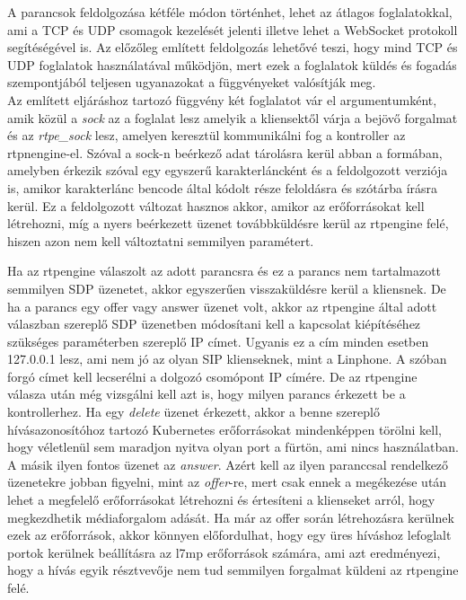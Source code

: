 A parancsok feldolgozása kétféle módon történhet, lehet az átlagos foglalatokkal, ami 
a TCP és UDP csomagok kezelését jelenti illetve lehet a WebSocket protokoll segítéségével 
is. Az előzőleg említett feldolgozás lehetővé teszi, hogy mind TCP és UDP
foglalatok használatával működjön, mert ezek a foglalatok küldés és fogadás szempontjából
teljesen ugyanazokat a függvényeket valósítják meg. \\

Az említett eljáráshoz tartozó függvény két foglalatot vár el argumentumként, amik közül 
a \textit{sock} az a foglalat lesz amelyik a kliensektől várja a bejövő forgalmat és az 
\textit{rtpe\_sock} lesz, amelyen keresztül kommunikálni fog a kontroller az rtpnengine-el. 
Szóval a sock-n beérkező adat tárolásra kerül abban a formában, amelyben érkezik szóval 
egy egyszerű karakterláncként és a feldolgozott verziója is, amikor karakterlánc bencode 
által kódolt része feloldásra és szótárba írásra kerül. Ez a feldolgozott változat hasznos 
akkor, amikor az erőforrásokat kell létrehozni, míg a nyers beérkezett üzenet továbbküldésre 
kerül az rtpengine felé, hiszen azon nem kell változtatni semmilyen paramétert.

Ha az rtpengine válaszolt az adott parancsra és ez a parancs nem tartalmazott semmilyen 
SDP üzenetet, akkor egyszerűen visszaküldésre kerül a kliensnek. De ha a parancs egy offer
vagy answer üzenet volt, akkor az rtpengine által adott válaszban szereplő SDP üzenetben
módosítani kell a kapcsolat kiépítéséhez szükséges paraméterben szereplő IP címet. Ugyanis
ez a cím minden esetben 127.0.0.1 lesz, ami nem jó az olyan SIP klienseknek, mint a Linphone.
A szóban forgó címet kell lecserélni a dolgozó csomópont IP címére. De az rtpengine 
válasza után még vizsgálni kell azt is, hogy milyen parancs érkezett be a kontrollerhez. 
Ha egy \textit{delete} üzenet érkezett, akkor a benne szereplő hívásazonosítóhoz tartozó
Kubernetes erőforrásokat mindenképpen törölni kell, hogy véletlenül sem maradjon nyitva
olyan port a fürtön, ami nincs használatban. A másik ilyen fontos üzenet az \textit{answer}.
Azért kell az ilyen paranccsal rendelkező üzenetekre jobban figyelni, mint az \textit{offer}-re,
mert csak ennek a megékezése után lehet a megfelelő erőforrásokat létrehozni és értesíteni
a klienseket arról, hogy megkezdhetik médiaforgalom adását. Ha már az offer során 
létrehozásra kerülnek ezek az erőforrások, akkor könnyen előfordulhat, hogy egy üres híváshoz
lefoglalt portok kerülnek beállításra az l7mp erőforrások számára, ami azt eredményezi, hogy
a hívás egyik résztvevője nem tud semmilyen forgalmat küldeni az rtpengine felé.